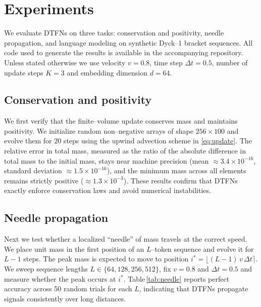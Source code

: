 \documentclass[10pt]{article}
\begin{document}
\section{Experiments}

We evaluate DTFNs on three tasks: conservation and positivity, needle
propagation, and language modeling on synthetic Dyck--1 bracket
sequences.  All code used to generate the results is available in the
accompanying repository.  Unless stated otherwise we use velocity
$v=0.8$, time step $\Delta t=0.5$, number of update steps $K=3$ and
embedding dimension $d=64$.

\subsection{Conservation and positivity}

We first verify that the finite--volume update conserves mass and maintains
positivity.  We initialize random non--negative arrays of shape $256\times
100$ and evolve them for $20$ steps using the upwind advection scheme in
\eqref{eq:update}.  The relative error in total mass, measured as the
ratio of the absolute difference in total mass to the initial mass, stays
near machine precision (mean $\approx 3.4\times10^{-16}$, standard
deviation $\approx 1.5\times10^{-16}$), and the minimum mass across all
elements remains strictly positive (\(\approx1.3\times10^{-3}\)).  These
results confirm that DTFNs exactly enforce conservation laws and avoid
numerical instabilities.

\subsection{Needle propagation}

Next we test whether a localized ``needle'' of mass travels at the
correct speed.  We place unit mass in the first position of an $L$--token
sequence and evolve it for $L{-}1$ steps.  The peak mass is expected to
move to position $i^*=\lfloor (L{-}1)\,v\,\Delta t \rceil$.  We sweep
sequence lengths $L\in\{64,128,256,512\}$, fix $v=0.8$ and $\Delta t=0.5$
and measure whether the peak occurs at $i^*$.  Table\,\ref{tab:needle}
reports perfect accuracy across 50 random trials for each $L$, indicating
that DTFNs propagate signals consistently over long distances.
\end{document}
